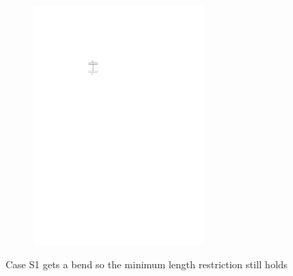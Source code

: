\begin{description}
\begin{itemize}
\begin{figure}[H]
\begin{subfigure}{0.4\linewidth}
		\includegraphics[width=0.7\textwidth,page=11]{drawings/2-trees.pdf}
	\end{subfigure}
	\caption{Case S1 gets a bend so the minimum length restriction still holds}\label{im:SPm_S1}
\end{figure}
\begin{figure}[H]
	\centering
	\begin{subfigure}{0.7\linewidth}
		\centering

\end{subfigure}
\end{figure}
\end{itemize}
\end{description}
